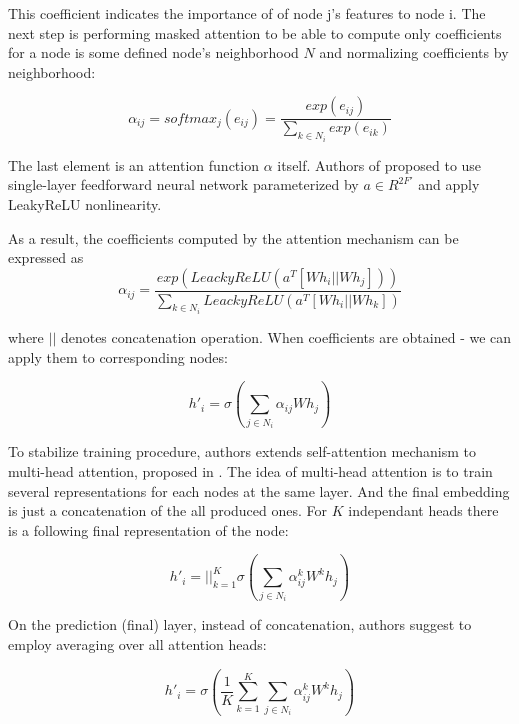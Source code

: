 This coefficient indicates the importance of of node j's features to node i. The next step is performing masked attention to 
be able to compute only coefficients for a node is some defined node's neighborhood $N$ and normalizing coefficients by neighborhood:


\begin{equation}
   \alpha_{ij} = softmax_j(e_{ij}) = \frac{exp(e_{ij})}{\sum_{k \in N_i}exp(e_{ik})}
\end{equation}

The last element is an attention function $\alpha$ itself. Authors of \cite{GAT} proposed to use
single-layer feedforward neural network parameterized by $a \in R^{2F'}$ and apply LeakyReLU nonlinearity.

As a result, the coefficients computed by the attention mechanism can be expressed as
\begin{equation}
    \alpha_{ij} = \frac{exp(LeackyReLU(a^{T}[Wh_i || Wh_j]))}{\sum_{k \in N_i}LeackyReLU(a^{T}[Wh_i || Wh_k])}
    \label{eq:final_att_coef}
 \end{equation}

where $||$ denotes concatenation operation. When coefficients are obtained - we can apply them to corresponding nodes:

\begin{equation}
    h'_i = \sigma \left( \sum_{j \in {N_i}} \alpha_{ij} W h_j \right)
    \label{eq:final_att}
 \end{equation}

To stabilize training procedure, authors extends self-attention mechanism
to multi-head attention, proposed in \cite{AttentionIsAllYouNeed}.
The idea of multi-head attention is to train several representations for each nodes at the same layer. And the final embedding
is just a concatenation of the all produced ones. For $K$ independant heads  there is a following final representation of the node:


\begin{equation}
    h'_i = ||_{k=1}^{K}  \sigma \left( \sum_{j \in {N_i}} \alpha^{k}_{ij} W^{k} h_j \right)
    \label{eq:multihead}
\end{equation}

On the prediction (final) layer, instead of concatenation, authors suggest to employ averaging over all attention heads:

\begin{equation}
    h'_i =  \sigma \left( \frac{1}{K} \sum_{k=1}^{K} \sum_{j \in {N_i}} \alpha^{k}_{ij} W^{k} h_j \right)
    \label{eq:multihead2}
\end{equation}

